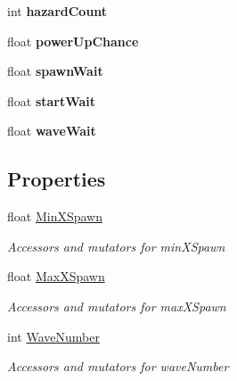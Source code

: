 \begin{DoxyCompactItemize}
int {\bfseries hazard\+Count}
\item 
\mbox{\label{class_game_controller_a8ba28d6303a0160af8934acd78201cb6}} 
float {\bfseries power\+Up\+Chance}
\item 
\mbox{\label{class_game_controller_a27c91a14de3982813ad3d8245d0134d7}} 
float {\bfseries spawn\+Wait}
\item 
\mbox{\label{class_game_controller_a9b6f96c29d3ee0f2c692c30ed2b12835}} 
float {\bfseries start\+Wait}
\item 
\mbox{\label{class_game_controller_ad210270b367c1c439d35e8177d989019}} 
float {\bfseries wave\+Wait}
\end{DoxyCompactItemize}
\subsection*{Properties}
\begin{DoxyCompactItemize}
\item 
float \mbox{\hyperlink{class_game_controller_ad358e1f216faf442ea6115ce732563d0}{Min\+X\+Spawn}}
\begin{DoxyCompactList}\small\item\em Accessors and mutators for min\+X\+Spawn \end{DoxyCompactList}\item 
float \mbox{\hyperlink{class_game_controller_a748b86a151833049c4c9a5e9d8487f16}{Max\+X\+Spawn}}
\begin{DoxyCompactList}\small\item\em Accessors and mutators for max\+X\+Spawn \end{DoxyCompactList}\item 
int \mbox{\hyperlink{class_game_controller_a92b2683fc2816c409a0f727914607e36}{Wave\+Number}}
\begin{DoxyCompactList}\small\item\em Accessors and mutators for wave\+Number \end{DoxyCompactList}\end{DoxyCompactItemize}



